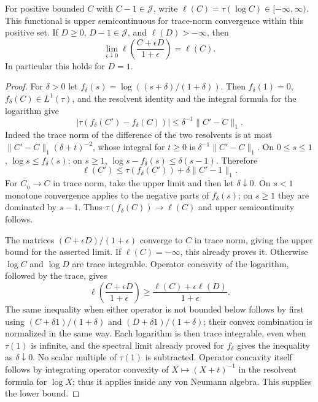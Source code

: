 \begin{lemma}
\label{geo-H-regularization}
For positive bounded $C$ with $C-1\in\mathcal J$, write
$\ell(C)=\tau(\log C)\in[-\infty,\infty)$. This functional is upper
semicontinuous for trace-norm convergence within this positive set. If
$D\geq0$, $D-1\in\mathcal J$, and $\ell(D)>-\infty$, then
\[
 \lim_{\epsilon\downarrow0}
 \ell\left(\frac{C+\epsilon D}{1+\epsilon}\right)=\ell(C).
\]
In particular this holds for $D=1$.
\end{lemma}
\begin{proof}
For $\delta>0$ let $f_\delta(s)=\log((s+\delta)/(1+\delta))$.
Then $f_\delta(1)=0$, $f_\delta(C)\in L^1(\tau)$, and the resolvent identity
and the integral formula for the logarithm give
\[
 |\tau(f_\delta(C')-f_\delta(C))|
 \leq\delta^{-1}\|C'-C\|_1.
\]
Indeed the trace norm of the difference of the two resolvents is at most
$\|C'-C\|_1(\delta+t)^{-2}$, whose integral for $t\geq0$ is
$\delta^{-1}\|C'-C\|_1$. On $0\leq s\leq1$, $\log s\leq f_\delta(s)$;
on $s\geq1$,
$\log s-f_\delta(s)\leq\delta(s-1)$. Therefore
\[
 \ell(C')\leq\tau(f_\delta(C'))+
                       \delta\|C'-1\|_1.
\]
For $C_n\to C$ in trace norm, take the upper limit and then let
$\delta\downarrow0$. On $s<1$ monotone convergence applies to the negative
parts of $f_\delta(s)$; on $s\geq1$ they are dominated by $s-1$.
Thus $\tau(f_\delta(C))\to\ell(C)$ and upper semicontinuity follows.

The matrices $(C+\epsilon D)/(1+\epsilon)$ converge to $C$ in trace norm,
giving the upper bound for the asserted limit. If $\ell(C)=-\infty$, this
already proves it. Otherwise $\log C$ and $\log D$ are trace integrable.
Operator concavity of the logarithm, followed by the trace, gives
\[
 \ell\left(\frac{C+\epsilon D}{1+\epsilon}\right)
 \geq\frac{\ell(C)+\epsilon\ell(D)}{1+\epsilon}.
\]
The same inequality when either operator is not bounded below follows by
first using $(C+\delta1)/(1+\delta)$ and
$(D+\delta1)/(1+\delta)$; their convex combination is normalized in the
same way. Each logarithm is then trace integrable, even when $\tau(1)$ is
infinite, and the spectral limit already proved for $f_\delta$ gives the
inequality as $\delta\downarrow0$. No scalar multiple of $\tau(1)$ is
subtracted. Operator concavity itself follows by integrating operator convexity
of $X\mapsto(X+t)^{-1}$ in the resolvent formula for $\log X$; thus it
applies inside any von Neumann algebra. This supplies the lower bound.
\end{proof}

